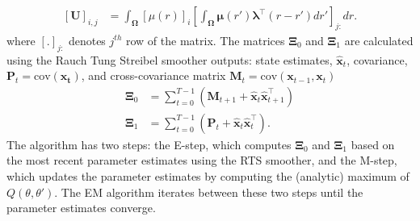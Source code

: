 \documentclass[journal,a4paper]{IEEEtran}
\newcommand{\cut}[1]{\textcolor{cyan}{#1}}
\begin{document}
\begin{align}
\left[ \mathbf U\right] _{i,j}&=\int_{\boldsymbol \Omega}\left[\mu(r) \right]_i \left[\int_{\boldsymbol\Omega} \boldsymbol\mu\left(r'\right)\boldsymbol \lambda^\top \left(r-r'\right) dr'\right]_{j:} dr.
\end{align}
where $[.]_{j:} $ denotes $j^{th}$ row of the matrix. The matrices $\boldsymbol\Xi_0$ and $\boldsymbol\Xi_1$ are calculated using the Rauch Tung Streibel smoother \cite{RAUCH1965} outputs: state estimates, $\hat{\mathbf x}_t$, covariance, $\mathbf P_t=\mathrm{cov}(\mathbf{x_t})$, and cross-covariance matrix $\mathbf M_t=\mathrm{cov}(\mathbf{x}_{t-1},\mathbf{x}_{t})$ \cite{Gibsona2005}
\begin{align}\label{eq:Xivariables}
\boldsymbol\Xi_0&=\sum_{t=0}^{T-1}\left(\mathbf M_{t+1}+\mathbf{\hat x}_t\mathbf{\hat x}_{t+1}^\top\right) \\
 \boldsymbol\Xi_1&=\sum_{t=0}^{T-1}\left(\mathbf P_t+\mathbf{\hat x}_t\mathbf{\hat x}_t^\top\right).
\end{align}
The algorithm has two steps: the E-step, which computes $\boldsymbol\Xi_0$ and $\boldsymbol\Xi_1$ based on the most recent parameter estimates using the RTS smoother, and the M-step, which updates the parameter estimates by computing the (analytic) maximum of $Q(\theta,\theta')$. The EM algorithm iterates between these two steps until the parameter estimates converge.
\end{document}
